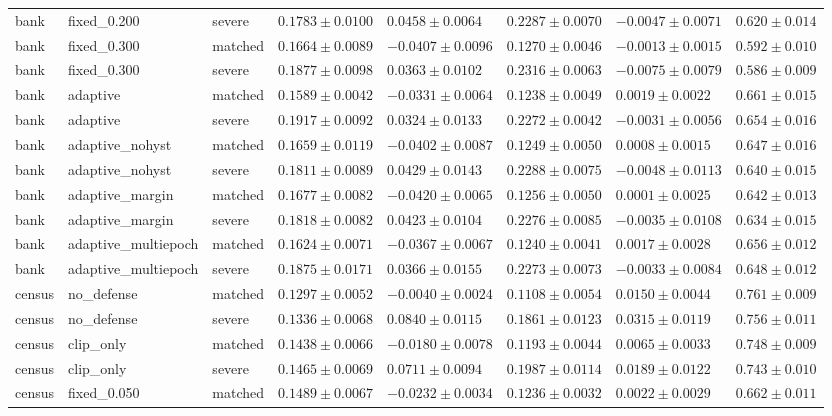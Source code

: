 \begin{table}[!t]
{\begin{tabular}{llllllll}
bank & fixed\_0.200 & severe & $0.1783\pm0.0100$ & $0.0458\pm0.0064$ & $0.2287\pm0.0070$ & $-0.0047\pm0.0071$ & $0.620\pm0.014$ \\
bank & fixed\_0.300 & matched & $0.1664\pm0.0089$ & $-0.0407\pm0.0096$ & $0.1270\pm0.0046$ & $-0.0013\pm0.0015$ & $0.592\pm0.010$ \\
bank & fixed\_0.300 & severe & $0.1877\pm0.0098$ & $0.0363\pm0.0102$ & $0.2316\pm0.0063$ & $-0.0075\pm0.0079$ & $0.586\pm0.009$ \\
bank & adaptive & matched & $0.1589\pm0.0042$ & $-0.0331\pm0.0064$ & $0.1238\pm0.0049$ & $0.0019\pm0.0022$ & $0.661\pm0.015$ \\
bank & adaptive & severe & $0.1917\pm0.0092$ & $0.0324\pm0.0133$ & $0.2272\pm0.0042$ & $-0.0031\pm0.0056$ & $0.654\pm0.016$ \\
bank & adaptive\_nohyst & matched & $0.1659\pm0.0119$ & $-0.0402\pm0.0087$ & $0.1249\pm0.0050$ & $0.0008\pm0.0015$ & $0.647\pm0.016$ \\
bank & adaptive\_nohyst & severe & $0.1811\pm0.0089$ & $0.0429\pm0.0143$ & $0.2288\pm0.0075$ & $-0.0048\pm0.0113$ & $0.640\pm0.015$ \\
bank & adaptive\_margin & matched & $0.1677\pm0.0082$ & $-0.0420\pm0.0065$ & $0.1256\pm0.0050$ & $0.0001\pm0.0025$ & $0.642\pm0.013$ \\
bank & adaptive\_margin & severe & $0.1818\pm0.0082$ & $0.0423\pm0.0104$ & $0.2276\pm0.0085$ & $-0.0035\pm0.0108$ & $0.634\pm0.015$ \\
bank & adaptive\_multiepoch & matched & $0.1624\pm0.0071$ & $-0.0367\pm0.0067$ & $0.1240\pm0.0041$ & $0.0017\pm0.0028$ & $0.656\pm0.012$ \\
bank & adaptive\_multiepoch & severe & $0.1875\pm0.0171$ & $0.0366\pm0.0155$ & $0.2273\pm0.0073$ & $-0.0033\pm0.0084$ & $0.648\pm0.012$ \\
census & no\_defense & matched & $0.1297\pm0.0052$ & $-0.0040\pm0.0024$ & $0.1108\pm0.0054$ & $0.0150\pm0.0044$ & $0.761\pm0.009$ \\
census & no\_defense & severe & $0.1336\pm0.0068$ & $0.0840\pm0.0115$ & $0.1861\pm0.0123$ & $0.0315\pm0.0119$ & $0.756\pm0.011$ \\
census & clip\_only & matched & $0.1438\pm0.0066$ & $-0.0180\pm0.0078$ & $0.1193\pm0.0044$ & $0.0065\pm0.0033$ & $0.748\pm0.009$ \\
census & clip\_only & severe & $0.1465\pm0.0069$ & $0.0711\pm0.0094$ & $0.1987\pm0.0114$ & $0.0189\pm0.0122$ & $0.743\pm0.010$ \\
census & fixed\_0.050 & matched & $0.1489\pm0.0067$ & $-0.0232\pm0.0034$ & $0.1236\pm0.0032$ & $0.0022\pm0.0029$ & $0.662\pm0.011$ \\

\end{tabular}}
\end{table}
